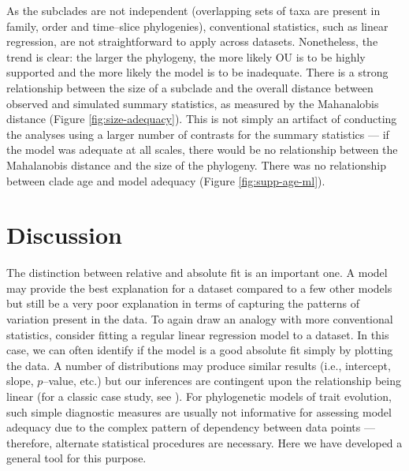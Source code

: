 \documentclass[a4paper,12pt]{article}
\begin{document}
As the subclades are not independent (overlapping sets of taxa are present in family, order and time--slice phylogenies), conventional statistics, such as linear regression, are not straightforward to apply across datasets. Nonetheless, the trend is clear: the larger the phylogeny, the more likely OU is to be highly supported and the more likely the model is to be inadequate. There is a strong relationship between the size of a subclade and the overall distance between observed and simulated summary statistics, as measured by the Mahanalobis distance (Figure \ref{fig:size-adequacy}). This is not simply an artifact of conducting the analyses using a larger number of contrasts for the summary statistics --- if the model was adequate at all scales, there would be no relationship between the Mahalanobis distance and the size of the phylogeny. There was no relationship between clade age and model adequacy (Figure \ref{fig:supp-age-ml}).
%


\section{Discussion}
%
%
The distinction between relative and absolute fit is an important one. A model may provide the best explanation for a dataset compared to a few other models but still be a very poor explanation in terms of capturing the patterns of variation present in the data. To again draw an analogy with more conventional statistics, consider fitting a regular linear regression model to a dataset. In this case, we can often identify if the model is a good absolute fit simply by plotting the data. A number of distributions may produce similar results (i.e., intercept, slope, $p$--value, etc.) but our inferences are contingent upon the relationship being linear (for a classic case study, see \citep{anscombe1973}). For phylogenetic models of trait evolution, such simple diagnostic measures are usually not informative for assessing model adequacy due to the complex pattern of dependency between data points --- therefore, alternate statistical procedures are necessary. Here we have developed a general tool for this purpose. 
\end{document}
